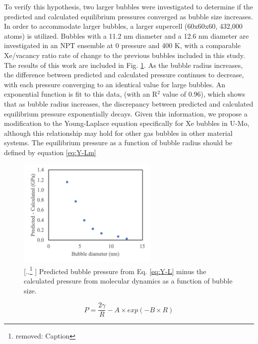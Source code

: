 \documentclass[review]{elsarticle}
\providecommand{\DIFaddtex}[1]{{\protect\color{blue} \sf #1}} %
\providecommand{\DIFdeltex}[1]{{\protect\color{red} [..\footnote{removed: #1} ]}} %
\providecommand{\DIFaddFL}[1]{\DIFadd{#1}} %
\providecommand{\DIFdelFL}[1]{\DIFdel{#1}} %
\providecommand{\DIFaddbeginFL}{} %
\providecommand{\DIFaddendFL}{} %
\providecommand{\DIFdelbeginFL}{} %
\providecommand{\DIFdelendFL}{} %
\providecommand{\DIFadd}[1]{\texorpdfstring{\DIFaddtex{#1}}{#1}} %
\providecommand{\DIFdel}[1]{\texorpdfstring{\DIFdeltex{#1}}{}} %
\newcommand{\DIFscaledelfig}{0.5}
\newlength{\DIFdelgraphicswidth} %
\newlength{\DIFdelgraphicsheight} %
\newcommand{\DIFaddincludegraphics}[2][]{{\color{blue}\fbox{\DIFOincludegraphics[#1]{#2}}}} %
\newcommand{\DIFdelincludegraphics}[2][]{%
\sbox{\DIFdelgraphicsbox}{\DIFOincludegraphics[#1]{#2}}%
\settoboxwidth{\DIFdelgraphicswidth}{\DIFdelgraphicsbox} %
\settoboxtotalheight{\DIFdelgraphicsheight}{\DIFdelgraphicsbox} %
\scalebox{\DIFscaledelfig}{%
\parbox[b]{\DIFdelgraphicswidth}{\usebox{\DIFdelgraphicsbox}\\[-\baselineskip] \rule{\DIFdelgraphicswidth}{0em}}\llap{\resizebox{\DIFdelgraphicswidth}{\DIFdelgraphicsheight}{%
\setlength{\unitlength}{\DIFdelgraphicswidth}%
\begin{picture}(1,1)%
\thicklines\linethickness{2pt} %
{\color[rgb]{1,0,0}\put(0,0){\framebox(1,1){}}}%
{\color[rgb]{1,0,0}\put(0,0){\line( 1,1){1}}}%
{\color[rgb]{1,0,0}\put(0,1){\line(1,-1){1}}}%
\end{picture}%
}\hspace*{3pt}}} %
} %
\DeclareRobustCommand{\DIFaddbeginFL}{\DIFOaddbeginFL \let\includegraphics\DIFaddincludegraphics} %
\DeclareRobustCommand{\DIFaddendFL}{\DIFOaddendFL \let\includegraphics\DIFOincludegraphics} %
\DeclareRobustCommand{\DIFdelbeginFL}{\DIFOdelbeginFL \let\includegraphics\DIFdelincludegraphics} %
\DeclareRobustCommand{\DIFdelendFL}{\DIFOaddendFL \let\includegraphics\DIFOincludegraphics} %
\begin{document}
To verify this hypothesis, two larger bubbles were investigated to determine if the predicted and calculated equilibrium pressures converged as bubble size increases. In order to accommodate larger bubbles, a larger supercell (60x60x60, 432,000 atoms) is utilized. Bubbles with a 11.2 nm diameter and a 12.6 nm diameter are investigated in an NPT ensemble at 0 pressure and 400 K, with a comparable Xe/vacancy ratio rate of change to the previous bubbles included in this study. The results of this work are included in Fig. \ref{fig:press_diff}. As the bubble radius increases, the difference between predicted and calculated pressure continues to decrease, with each pressure converging to an identical value for large bubbles. An exponential function is fit to this data, (with an R$^2$ value of 0.96), which shows that as bubble radius increases, the discrepancy between predicted and calculated equilibrium pressure exponentially decays. Given this information, we propose a modification to the Young-Laplace equation specifically for Xe bubbles in U-Mo, although this relationship may hold for other gas bubbles in other material systems. The equilibrium pressure as a function of bubble radius should be defined by equation \ref{eq:Y-Lm}

\begin{figure}[h]
 \centering
 \includegraphics[width=0.6\textwidth]{6_press_diff.png} 
 \caption{\DIFdelbeginFL \DIFdelFL{Caption}\DIFdelendFL \DIFaddbeginFL \DIFaddFL{Predicted bubble pressure from Eq}\DIFaddendFL . \DIFaddbeginFL \DIFaddFL{\ref{eq:Y-L} minus the calculated pressure from molecular dynamics as a function of bubble size.}\DIFaddendFL }
 \label{fig:press_diff}
\end{figure}

\begin{equation}
\label{eq:Y-Lm}
P = \frac{2\gamma}{R} - A \times exp(-B\times R)
\end{equation}
\end{document}
